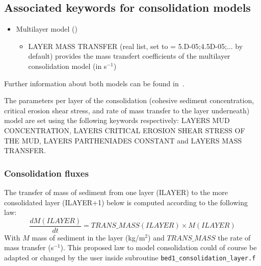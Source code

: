 \subsection{Associated keywords for consolidation models}
\begin{itemize}
\item Multilayer model ()
\begin{itemize}
\item {\ttfamily LAYER MASS TRANSFER} (real list, set to {\ttfamily = 5.D-05;4.5D-05;...} by default) provides the mass transfert coefficients of the multilayer consolidation model (in s$^{-1}$)
\end{itemize}
\end{itemize}

Further information about both models can be found in~\cite{Lan12}.

The parameters per layer of the consolidation (cohesive sediment concentration, critical erosion shear stress, and rate of mass transfer to the layer underneath) model are set using the following keywords respectively: {\ttfamily LAYERS MUD CONCENTRATION}, {\ttfamily LAYERS CRITICAL EROSION SHEAR STRESS OF THE MUD}, {\ttfamily LAYERS PARTHENIADES CONSTANT} and {\ttfamily LAYERS MASS TRANSFER}.

\subsubsection{Consolidation fluxes}
The transfer of mass of sediment from one layer ({\ttfamily ILAYER}) to the more consolidated layer ({\ttfamily ILAYER+1}) below is computed according to the following law: %
\begin{equation}
  \frac{dM(ILAYER)}{dt}=TRANS\_MASS(ILAYER )\times M(ILAYER)
\end{equation}
With $M$ mass of sediment in the layer (kg/m$^2$) and $TRANS\_MASS$ the rate of mass transfer (s$^{-1}$).
This proposed law to model consolidation could of course be adapted or changed by the user inside subroutine \texttt{bed1\_consolidation\_layer.f}
